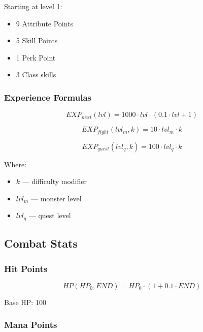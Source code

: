 \documentclass[a4paper,12pt]{article}
\begin{document}
Starting at level 1:

\begin{itemize}
\item 9 Attribute Points
\item 5 Skill Points
\item 1 Perk Point
\item 3 Class skills
\end{itemize}

\subsubsection{Experience Formulas}

\begin{equation}
EXP_{next}(lvl) = 1000 \cdot lvl \cdot (0.1 \cdot lvl + 1)
\end{equation}

\begin{equation}
EXP_{fight}(lvl_m, k) = 10 \cdot lvl_m \cdot k
\end{equation}

\begin{equation}
EXP_{quest}(lvl_q, k) = 100 \cdot lvl_q \cdot k
\end{equation}

Where:

\begin{itemize}
\item $k$ — difficulty modifier
\item $lvl_m$ — monster level
\item $lvl_q$ — quest level
\end{itemize}



\subsection{Combat Stats}

\subsubsection{Hit Points}

\begin{equation}
HP(HP_0, END) = HP_0 \cdot (1 + 0.1 \cdot END)
\end{equation}

Base HP: 100

\subsubsection{Mana Points}
\end{document}
